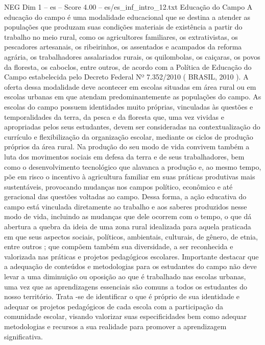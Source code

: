 \begin{textsample}{NEG Dim 1 – es – Score 4.00 – es/es\_inf\_intro\_12.txt}  \label{ex:f1_neg_099}
Educação do Campo A educação do campo é uma modalidade educacional que se destina a atender as populações que produzam suas condições materiais de existência a partir do trabalho no meio rural, como os agricultores familiares, os extrativistas, os pescadores artesanais, os ribeirinhos, os assentados e acampados da reforma agrária, os trabalhadores assalariados rurais, os quilombolas, os caiçaras, os povos da floresta, os caboclos, entre outros, de acordo com a Política de Educação do Campo estabelecida pelo Decreto Federal Nº 7.352/2010 ( BRASIL, 2010 ).
A oferta dessa modalidade deve acontecer em escolas situadas em área rural ou em escolas urbanas em que atendam predominantemente as populações do campo.
As escolas do campo possuem identidades muito próprias, vinculadas às questões e temporalidades da terra, da pesca e da floresta que, uma vez vividas e apropriadas pelos seus estudantes, devem ser consideradas na contextualização do currículo e flexibilização da organização escolar, mediante os ciclos de produção próprios da área rural.
Na produção do seu modo de vida convivem também a luta dos movimentos sociais em defesa da terra e de seus trabalhadores, bem como o desenvolvimento tecnológico que alavanca a produção e, ao mesmo tempo, põe em risco o incentivo à agricultura familiar em suas práticas produtivas mais sustentáveis, provocando mudanças nos campos político, econômico e até geracional das questões voltadas ao campo.
Dessa forma, a ação educativa do campo está vinculada diretamente ao trabalho e aos saberes produzidos nesse modo de vida, incluindo as mudanças que dele ocorrem com o tempo, o que dá abertura a quebra da ideia de uma zona rural idealizada para aquela praticada em que seus aspectos sociais, políticos, ambientais, culturais, de gênero, de etnia, entre outros ; que compõem também sua diversidade, a ser reconhecida e valorizada nas práticas e projetos pedagógicos escolares.
Importante destacar que a adequação de conteúdos e metodologias para os estudantes do campo não deve levar a uma diminuição ou oposição ao que é trabalhado nas escolas urbanas, uma vez que as aprendizagens essenciais são comuns a todos os estudantes do nosso território.
Trata -se de identificar o que é próprio de sua identidade e adequar os projetos pedagógicos de cada escola com a participação da comunidade escolar, visando valorizar suas especificidades bem como adequar metodologias e recursos a sua realidade para promover a aprendizagem significativa.

\end{textsample}
